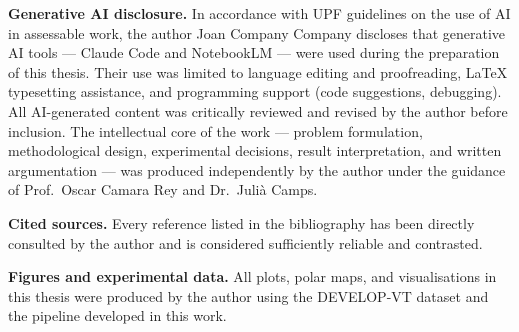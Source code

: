 \vspace{0.8em}
\noindent\textbf{Generative AI disclosure.}
In accordance with UPF guidelines on the use of AI in assessable work, the author
Joan Company Company discloses that generative AI tools --- Claude Code and NotebookLM
--- were used during the preparation of this thesis. Their use was limited to language
editing and proofreading, \LaTeX{} typesetting assistance, and programming support
(code suggestions, debugging). All AI-generated content was critically reviewed and
revised by the author before inclusion. The intellectual core of the work --- problem
formulation, methodological design, experimental decisions, result interpretation, and
written argumentation --- was produced independently by the author under the guidance
of Prof.\ Oscar Camara Rey and Dr.\ Juli\`{a} Camps.

\vspace{0.8em}
\noindent\textbf{Cited sources.}
Every reference listed in the bibliography has been directly consulted by the author
and is considered sufficiently reliable and contrasted.

\vspace{0.8em}
\noindent\textbf{Figures and experimental data.}
All plots, polar maps, and visualisations in this thesis were produced by the author
using the DEVELOP-VT dataset and the pipeline developed in this work.

\cleardoublepage
